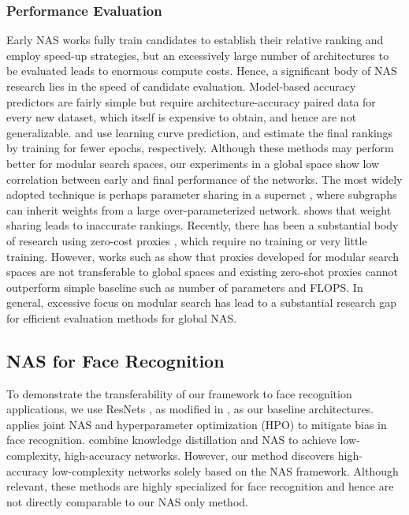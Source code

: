 \subsubsection{Performance Evaluation}


Early NAS works \cite{zoph2016RL,MetaQNN,Real_evolution,GeneticProgrammingCNN} fully train candidates to establish their relative ranking and employ speed-up strategies, but an excessively large number of architectures to be evaluated leads to enormous compute costs. Hence, a significant body of NAS research lies in the speed of candidate evaluation. Model-based accuracy predictors are fairly simple \cite{modelbasedpredictor} but require architecture-accuracy paired data for every new dataset, which itself is expensive to obtain, and hence are not generalizable. \cite{EarlyTermination} and \cite{MDENAS} use learning curve prediction, and estimate the final rankings by training for fewer epochs, respectively. Although these methods may perform better for modular search spaces, our experiments in a global space show low correlation between early and final performance of the networks. The most widely adopted technique is perhaps parameter sharing in a supernet \cite{ENAS}, where subgraphs can inherit weights from a large over-parameterized network. \cite{EvaluatingSearch} shows that weight sharing leads to inaccurate rankings. Recently, there has been a substantial body of research using zero-cost proxies \cite{zerocostproxies}, which require no training or very little training. However, works such as \cite{antizeroshot,antizeroshotNIPS} show that proxies developed for modular search spaces are not transferable to global spaces and existing zero-shot proxies cannot outperform simple baseline such as number of parameters and FLOPS. In general, excessive focus on modular search has lead to a substantial research gap for efficient evaluation methods for global NAS.

\subsection{NAS for Face Recognition}

To demonstrate the transferability of our framework to face recognition applications, we use ResNets \cite{ResNet}, as modified in \cite{Adaface,Arcface}, as our baseline architectures. \cite{FairFace} applies joint NAS and hyperparameter optimization (HPO) to mitigate bias in face recognition. \cite{TeachNAS,PocketNet} combine knowledge distillation and NAS to achieve low-complexity, high-accuracy networks. However, our method discovers high-accuracy low-complexity networks solely based on the NAS framework. Although relevant, these methods are highly specialized for face recognition and hence are not directly comparable to our NAS only method.    
